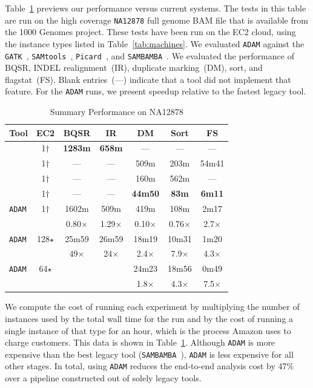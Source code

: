 \documentclass{acm_proc_article-sp}
\begin{document}
Table~\ref{tab:overview} previews our performance versus current systems. The tests in this table are run on the
high coverage \texttt{NA12878} full genome BAM file that is available from the 1000 Genomes
project. These tests have been run on the EC2 cloud, using the instance types listed in
Table~\ref{tab:machines}. We evaluated \texttt{ADAM} against the \texttt{GATK}~\cite{depristo11},
\texttt{SAMtools}~\cite{li11}, \texttt{Picard}~\cite{picard}, and \texttt{SAMBAMBA}~\cite{sambamba}. We evaluated
the performance of BQSR, INDEL realignment~(IR), duplicate marking~(DM), sort, and flagstat~(FS). Blank
entries~(---) indicate that a tool did not implement that feature. For the \texttt{ADAM} runs, we present
speedup relative to the fastest legacy tool.

\begin{table}[h]
\caption{Summary Performance on NA12878}
\label{tab:overview}
\begin{center}
\begin{tabular}{ l c c c c c c }
\hline
\bf Tool & \bf EC2 & \bf BQSR & \bf IR & \bf DM & \bf Sort & \bf FS \\
\hline
\cite{depristo11} & 1$\dagger$ & \bf 1283m & \bf 658m & --- & --- & --- \\
\cite{li11} & 1$\dagger$ & --- & --- & 509m & 203m & 54m41 \\
\cite{picard} & 1$\dagger$ & --- & --- & 160m & 562m & --- \\
\cite{sambamba} & 1$\dagger$ & --- & --- & \bf 44m50 & \bf 83m & \bf 6m11 \\
\hline
\texttt{ADAM} & 1$\dagger$ & 1602m & 509m & 419m & 108m & 2m17 \\
 & & 0.80$\times$ & 1.29$\times$ & 0.10$\times$ & 0.76$\times$ & 2.7$\times$ \\
\hline
\texttt{ADAM} & 128$\star$ & 25m59 & 26m59 & 18m19 & 10m31 & 1m20 \\
 & & 49$\times$ & 24$\times$ & 2.4$\times$ & 7.9$\times$ & 4.3$\times$ \\
\hline
\texttt{ADAM} & 64$\star$ &  &  & 24m23 & 18m56 & 0m49 \\
 & & & & 1.8$\times$ & 4.3$\times$ & 7.5$\times$ \\
\end{tabular}
\end{center}
\end{table}

We compute the cost of running each experiment by multiplying the number of instances
used by the total wall time for the run and by the cost of running a single instance of that type for an hour, which is
the process Amazon uses to charge customers. This data is shown in Table~\ref{tab:overview}. Although \texttt{ADAM}
is more expensive than the best legacy tool (\texttt{SAMBAMBA}~\cite{sambamba}), \texttt{ADAM} is less expensive
for all other stages. In total, using \texttt{ADAM} reduces the end-to-end analysis cost by 47\% over a pipeline
constructed out of solely legacy tools.
\end{document}
